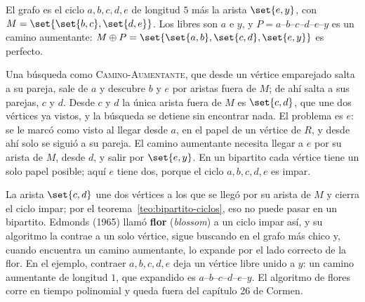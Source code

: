 \documentclass[11pt,letterpaper]{article}
\begin{document}
\begin{ejemplo}
  \label{ej:emparejamiento-flor}
  El grafo es el ciclo $a, b, c, d, e$ de longitud $5$ más la arista
  $\set{e, y}$, con $M = \set{\set{b,c}, \set{d,e}}$. Los libres son
  $a$ e $y$, y $P = a$--$b$--$c$--$d$--$e$--$y$ es un camino
  aumentante: $M \oplus P = \set{\set{a,b}, \set{c,d}, \set{e,y}}$
  es perfecto.
  \begin{center}
  \end{center}
  Una búsqueda como \textsc{Camino-Aumentante}, que desde un vértice
  emparejado salta a su pareja, sale de $a$ y descubre $b$ y $e$ por
  aristas fuera de $M$; de ahí salta a sus parejas, $c$ y $d$. Desde
  $c$ y $d$ la única arista fuera de $M$ es $\set{c, d}$, que une dos
  vértices ya vistos, y la búsqueda se detiene sin encontrar nada. El
  problema es $e$: se le marcó como visto al llegar desde $a$, en el
  papel de un vértice de $R$, y desde ahí solo se siguió a su pareja.
  El camino aumentante necesita llegar a $e$ por su arista de $M$,
  desde $d$, y salir por $\set{e, y}$. En un bipartito cada vértice
  tiene un solo papel posible; aquí $e$ tiene dos, porque el ciclo
  $a, b, c, d, e$ es impar.
\end{ejemplo}

La arista $\set{c, d}$ une dos vértices a los que se llegó por su
arista de $M$ y cierra el ciclo impar; por el
teorema~\ref{teo:bipartito-ciclos}, eso no puede pasar en un
bipartito. Edmonds (1965) llamó \textbf{flor} (\textit{blossom}) a un
ciclo impar así, y su algoritmo la contrae a un solo vértice, sigue
buscando en el grafo más chico y, cuando encuentra un camino
aumentante, lo expande por el lado correcto de la flor. En el
ejemplo, contraer $a, b, c, d, e$ deja un vértice libre unido a $y$:
un camino aumentante de longitud $1$, que expandido es
$a$--$b$--$c$--$d$--$e$--$y$. El algoritmo de flores corre en tiempo
polinomial y queda fuera del capítulo 26 de Cormen.
\end{document}
